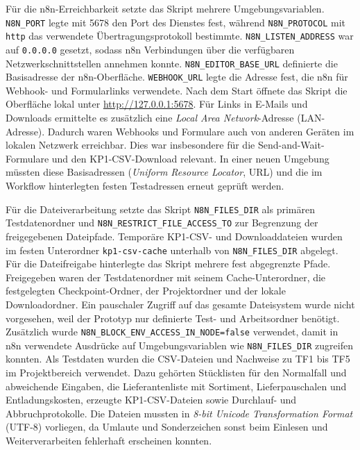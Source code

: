 \documentclass[a4paper,12pt]{article}
\begin{document}
Für die n8n-Erreichbarkeit setzte das Skript mehrere Umgebungsvariablen. \texttt{N8N\_PORT} legte mit 5678 den Port des Dienstes fest, während \texttt{N8N\_PROTOCOL} mit \texttt{http} das verwendete Übertragungsprotokoll bestimmte. \texttt{N8N\_LISTEN\_ADDRESS} war auf \texttt{0.0.0.0} gesetzt, sodass n8n Verbindungen über die verfügbaren Netzwerkschnittstellen annehmen konnte. \texttt{N8N\_EDITOR\_BASE\_URL} definierte die Basisadresse der n8n-Oberfläche. \texttt{WEBHOOK\_URL} legte die Adresse fest, die n8n für Webhook- und Formularlinks verwendete. Nach dem Start öffnete das Skript die Oberfläche lokal unter \url{http://127.0.0.1:5678}. Für Links in E-Mails und Downloads ermittelte es zusätzlich eine \textit{Local Area Network}-Adresse (LAN-Adresse). Dadurch waren Webhooks und Formulare auch von anderen Geräten im lokalen Netzwerk erreichbar. Dies war insbesondere für die Send-and-Wait-Formulare und den KP1-CSV-Download relevant. In einer neuen Umgebung müssten diese Basisadressen (\textit{Uniform Resource Locator}, URL) und die im Workflow hinterlegten festen Testadressen erneut geprüft werden.

Für die Dateiverarbeitung setzte das Skript \texttt{N8N\_FILES\_DIR} als primären Testdatenordner und \texttt{N8N\_RESTRICT\_FILE\_ACCESS\_TO} zur Begrenzung der freigegebenen Dateipfade. Temporäre KP1-CSV- und Downloaddateien wurden im festen Unterordner \texttt{kp1-csv-cache} unterhalb von \texttt{N8N\_FILES\_DIR} abgelegt. Für die Dateifreigabe hinterlegte das Skript mehrere fest abgegrenzte Pfade. Freigegeben waren der Testdatenordner mit seinem Cache-Unterordner, die festgelegten Checkpoint-Ordner, der Projektordner und der lokale Downloadordner. Ein pauschaler Zugriff auf das gesamte Dateisystem wurde nicht vorgesehen, weil der Prototyp nur definierte Test- und Arbeitsordner benötigt. Zusätzlich wurde \texttt{N8N\_BLOCK\_ENV\_ACCESS\_IN\_NODE=false} verwendet, damit in n8n verwendete Ausdrücke auf Umgebungsvariablen wie \texttt{N8N\_FILES\_DIR} zugreifen konnten. Als Testdaten wurden die CSV-Dateien und Nachweise zu TF1 bis TF5 im Projektbereich verwendet. Dazu gehörten Stücklisten für den Normalfall und abweichende Eingaben, die Lieferantenliste mit Sortiment, Lieferpauschalen und Entladungskosten, erzeugte KP1-CSV-Dateien sowie Durchlauf- und Abbruchprotokolle. Die Dateien mussten in \textit{8-bit Unicode Transformation Format} (UTF-8) vorliegen, da Umlaute und Sonderzeichen sonst beim Einlesen und Weiterverarbeiten fehlerhaft erscheinen konnten.
\end{document}

